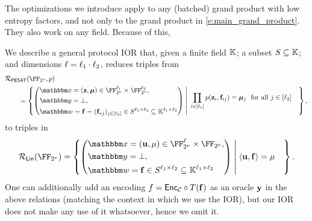 \documentclass[11pt,letterpaper,usenames,dvipsnames]{article}
\begin{document}
 The optimizations we introduce apply to any (batched) grand product with low entropy factors, and not only to the grand product in \eqref{e:main_grand_product}. They also work on any field. Because of this, 
 
 We  describe a general protocol IOR  that, given a finite field $\mathbb{K}$; %
 a subset $S\subseteq \mathbb{K}$; and dimensions $\ell=\ell_1\cdot \ell_2$, reduces triples from 
%
\begin{align*}
&\PESAT(\comfield, \gkrpol)\\ &\qquad = \left\{ \left(\begin{aligned} &\inp=(\zz,\bm{\mu})\in \comfield^{\codedim_1}\times \comfield^{\codedim_2}, \\
&\oracle=\bot,\\
&\wit=\bff= (\bff_{*j})_{j\in [\codedim_2]}\in S^{\codedim_1 \times \codedim_2} \subseteq \KK^{\codedim_1 \times \codedim_2}\end{aligned}\right) \;\middle|\;  \begin{aligned}   %
&\prod_{i\in[\codedim_1]} \gkrpol(\zz_i, \bff_{ij}) = \bm{\mu}_j \ \text{ for all } j\in [\codedim_2]\end{aligned}  \right\},
\end{align*}
%
to triples in 
%
$$
\LIN( \comfield)  = \left\{ \left(\begin{aligned} &\inp=(\uu,\mu)\in \comfield^\codedim \times \comfield, \\
&\oracle=\bot,\\
&\wit= \bff\in S^{\codedim_1\times \codedim_2}\subseteq \KK^{\codedim_1 \times \codedim_2}\end{aligned}\right) \;\middle|\;  \begin{aligned} 
&\langle \uu, \bff\rangle = \mu  \end{aligned}\right\}.
$$
%
One can additionally add an encoding $f=\mathsf{Enc}_{\mathcal{C}}\circ T (\mathbf{f})$ as an oracle $\mathbf{y}$ in the above relations (matching the context in which we use the IOR), but our IOR does not make any use of it whatsoever, hence we omit it. 
\end{document}

